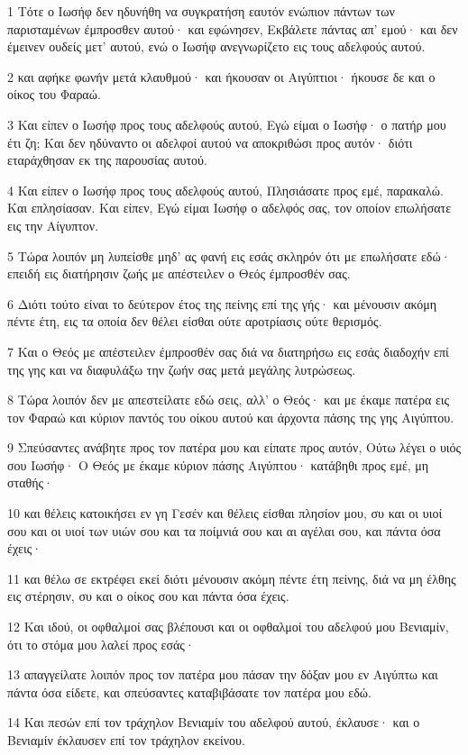 \par 1 Τότε ο Ιωσήφ δεν ηδυνήθη να συγκρατήση εαυτόν ενώπιον πάντων των παρισταμένων έμπροσθεν αυτού· και εφώνησεν, Εκβάλετε πάντας απ' εμού· και δεν έμεινεν ουδείς μετ' αυτού, ενώ ο Ιωσήφ ανεγνωρίζετο εις τους αδελφούς αυτού.
\par 2 και αφήκε φωνήν μετά κλαυθμού· και ήκουσαν οι Αιγύπτιοι· ήκουσε δε και ο οίκος του Φαραώ.
\par 3 Και είπεν ο Ιωσήφ προς τους αδελφούς αυτού, Εγώ είμαι ο Ιωσήφ· ο πατήρ μου έτι ζη; Και δεν ηδύναντο οι αδελφοί αυτού να αποκριθώσι προς αυτόν· διότι εταράχθησαν εκ της παρουσίας αυτού.
\par 4 Και είπεν ο Ιωσήφ προς τους αδελφούς αυτού, Πλησιάσατε προς εμέ, παρακαλώ. Και επλησίασαν. Και είπεν, Εγώ είμαι Ιωσήφ ο αδελφός σας, τον οποίον επωλήσατε εις την Αίγυπτον.
\par 5 Τώρα λοιπόν μη λυπείσθε μηδ' ας φανή εις εσάς σκληρόν ότι με επωλήσατε εδώ· επειδή εις διατήρησιν ζωής με απέστειλεν ο Θεός έμπροσθέν σας.
\par 6 Διότι τούτο είναι το δεύτερον έτος της πείνης επί της γής· και μένουσιν ακόμη πέντε έτη, εις τα οποία δεν θέλει είσθαι ούτε αροτρίασις ούτε θερισμός.
\par 7 Και ο Θεός με απέστειλεν έμπροσθέν σας διά να διατηρήσω εις εσάς διαδοχήν επί της γης και να διαφυλάξω την ζωήν σας μετά μεγάλης λυτρώσεως.
\par 8 Τώρα λοιπόν δεν με απεστείλατε εδώ σεις, αλλ' ο Θεός· και με έκαμε πατέρα εις τον Φαραώ και κύριον παντός του οίκου αυτού και άρχοντα πάσης της γης Αιγύπτου.
\par 9 Σπεύσαντες ανάβητε προς τον πατέρα μου και είπατε προς αυτόν, Ούτω λέγει ο υιός σου Ιωσήφ· Ο Θεός με έκαμε κύριον πάσης Αιγύπτου· κατάβηθι προς εμέ, μη σταθής·
\par 10 και θέλεις κατοικήσει εν γη Γεσέν και θέλεις είσθαι πλησίον μου, συ και οι υιοί σου και οι υιοί των υιών σου και τα ποίμνιά σου και αι αγέλαι σου, και πάντα όσα έχεις·
\par 11 και θέλω σε εκτρέφει εκεί διότι μένουσιν ακόμη πέντε έτη πείνης, διά να μη έλθης εις στέρησιν, συ και ο οίκος σου και πάντα όσα έχεις.
\par 12 Και ιδού, οι οφθαλμοί σας βλέπουσι και οι οφθαλμοί του αδελφού μου Βενιαμίν, ότι το στόμα μου λαλεί προς εσάς·
\par 13 απαγγείλατε λοιπόν προς τον πατέρα μου πάσαν την δόξαν μου εν Αιγύπτω και πάντα όσα είδετε, και σπεύσαντες καταβιβάσατε τον πατέρα μου εδώ.
\par 14 Και πεσών επί τον τράχηλον Βενιαμίν του αδελφού αυτού, έκλαυσε· και ο Βενιαμίν έκλαυσεν επί τον τράχηλον εκείνου.
